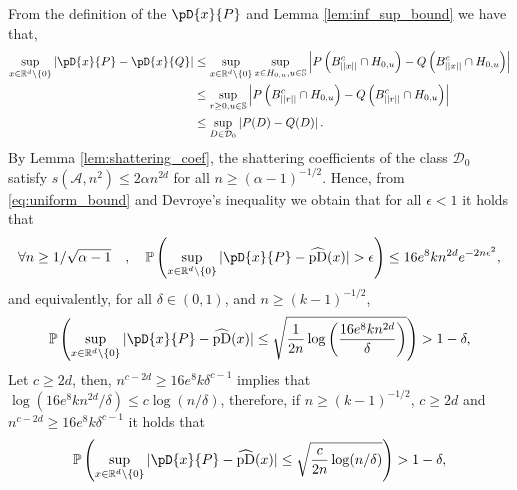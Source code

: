 \documentclass{article}
\numberwithin{equation}{section}
\renewcommand{\P}{\mathbb{P}}
\newcommand{\rset}{\mathbb{R}}
\newcommand{\sphere}{\mathbb{S}}
\newcommand{\coD}[2]{\pD{#1}{#2}}
\begin{document}
    From the definition of the \(\coD{x}{P}\) and Lemma
    \ref{lem:inf_sup_bound} we have that,
    \begin{align}
        \sup_{x\in\rset^d\setminus\{0\}  } |\coD{x}{P} - \coD{x}{Q}| & \leq
        \sup_{x\in\rset^d\setminus\{0\}}\sup_{x\in H_{0,u},
        u\in\sphere}{\left| P\left({B}^c_{||x||}\cap H_{0,u}\right) -
        Q\left({B}^c_{||x||}\cap H_{0,u}\right) \right|}\nonumber
        \\
        & \leq \sup_{r\geq 0, u\in\sphere} \left|
        P\left({B}^c_{||r||}\cap H_{0,u}\right) -
        Q\left({B}^c_{||r||}\cap H_{0,u}\right) \right|\nonumber
        \\
        & \leq \sup_{D\in\mathcal{D}_0} \left| P(D)-Q(D)
        \right|\label{eq:uniform_bound}.
    \end{align}
    By Lemma \ref{lem:shattering_coef}, the shattering coefficients of
    the class \(\mathcal{D}_0\) satisfy \(s(\mathcal{A},n^2)\leq
    2\alpha n^{2d}\) for all \(n\geq (\alpha-1)^{-1/2}\).
    Hence,
    from \eqref{eq:uniform_bound} and Devroye's inequality
    \cite[Theorem 12.8]{devroye2013probabilistic} we obtain that
    for all \(\epsilon<1\) it holds that
    \begin{equation}\label{eq:devroye_ineq_cod}
        \forall n\geq 1/\sqrt{\alpha-1} \quad,\quad
        \P\left(\sup_{x\in\rset^d\setminus\{0\}  } |\coD{x}{P} -
        \widehat{\mathrm{pD}}(x)|>\epsilon\right)\leq 16e^8 k n^{2d} e^{-2n\epsilon^2},
    \end{equation}
    and equivalently, for all \(\delta\in(0,1)\), and \(n\geq (k-1)^{-1/2}\),
    \begin{equation}\label{eq:devroye_ineq_cod_prob}
        \P\left(\sup_{x\in\rset^d\setminus\{0\}  } |\coD{x}{P} -
            \widehat{\mathrm{pD}}(x)|\leq  \sqrt{\frac{1}{2n}\log{\left(\frac{16 e^8 k
        n^{2d}}{\delta}\right)}} \right)>1-\delta,
    \end{equation}
    Let \(c\geq 2d\), then, \(n^{c-2d}\geq 16 e^8 k \delta^{c-1}\)
    implies that \({\log({16 e^8 k n^{2d}/\delta})}\leq c\log(n/\delta)\),
    therefore, if \(n\geq (k-1)^{-1/2}\), \(c\geq 2d\) and
    \(n^{c-2d}\geq 16 e^8 k \delta^{c-1}\) it holds that
    \begin{equation}\label{eq:devroye_ineq_cod_prob_long}
        \P\left(\sup_{x\in\rset^d\setminus\{0\}  } |\coD{x}{P} -
        \widehat{\mathrm{pD}}(x)|\leq  \sqrt{\frac{c}{2n}\log (n/\delta)} \right)>1-\delta,
    \end{equation}
\end{document}
